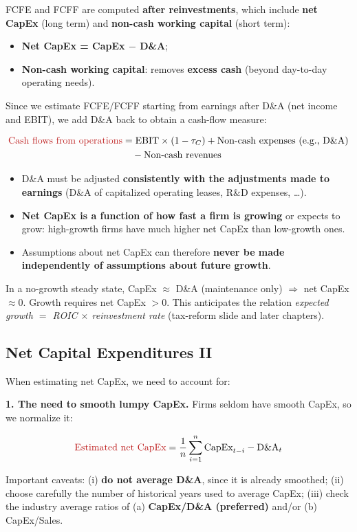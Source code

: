 FCFE and FCFF are computed \textbf{after reinvestments}, which include \textbf{net CapEx} (long term) and \textbf{non-cash working capital} (short term):
\begin{itemize}
  \item \textbf{Net CapEx = CapEx $-$ D\&A};
  \item \textbf{Non-cash working capital}: removes \textbf{excess cash} (beyond day-to-day operating needs).
\end{itemize}
Since we estimate FCFE/FCFF starting from earnings after D\&A (net income and EBIT), we add D\&A back to obtain a cash-flow measure:
\begin{keybox}
\begin{align*}
\textcolor{keyred}{\text{Cash flows from operations}} &= \text{EBIT}\times(1-\tau_C) + \text{Non-cash expenses (e.g., D\&A)}\\
&\quad - \text{Non-cash revenues}
\end{align*}
\end{keybox}
\begin{itemize}
  \item D\&A must be adjusted \textbf{consistently with the adjustments made to earnings} (D\&A of capitalized operating leases, R\&D expenses, \dots).
  \item \textbf{Net CapEx is a function of how fast a firm is growing} or expects to grow: high-growth firms have much higher net CapEx than low-growth ones.
  \item Assumptions about net CapEx can therefore \textbf{never be made independently of assumptions about future growth}.
\end{itemize}

\begin{addbox}
In a no-growth steady state, CapEx $\approx$ D\&A (maintenance only) $\Rightarrow$ net CapEx $\approx0$. Growth requires net CapEx $>0$. This anticipates the relation \emph{expected growth $=$ ROIC $\times$ reinvestment rate} (tax-reform slide and later chapters).
\end{addbox}

\subsection{Net Capital Expenditures II}

When estimating net CapEx, we need to account for:

\textbf{1. The need to smooth lumpy CapEx.} Firms seldom have smooth CapEx, so we normalize it:
\begin{keybox}
\[
\textcolor{keyred}{\text{Estimated net CapEx}} = \frac{1}{n}\sum_{i=1}^{n}\text{CapEx}_{t-i} - \text{D\&A}_t
\]
\end{keybox}
Important caveats: (i) \textbf{do not average D\&A}, since it is already smoothed; (ii) choose carefully the number of historical years used to average CapEx; (iii) check the industry average ratios of (a) \textbf{CapEx/D\&A (preferred)} and/or (b) CapEx/Sales.

